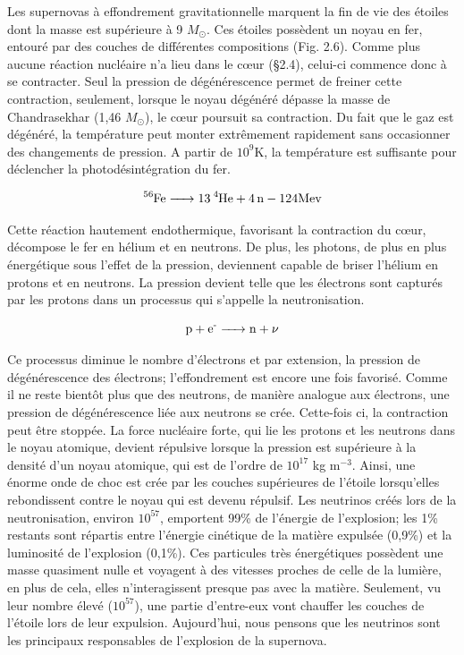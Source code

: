 Les supernovas à effondrement gravitationnelle marquent la fin de vie des étoiles dont la masse est supérieure à 9 $M_\odot$. Ces étoiles possèdent un noyau en fer, entouré par des couches de différentes compositions (Fig. 2.6). Comme plus aucune réaction nucléaire n'a lieu dans le cœur (§2.4), celui-ci commence donc à se contracter. Seul la pression de dégénérescence permet de freiner cette contraction, seulement, lorsque le noyau dégénéré dépasse la masse de Chandrasekhar (1,46 $M_\odot$), le cœur poursuit sa contraction. Du fait que le gaz est dégénéré, la température peut monter extrêmement rapidement sans occasionner des changements de pression. A partir de $10^{9}$K, la température est suffisante pour déclencher la photodésintégration du fer.\bigskip  %

\begin{equation} \ce{\ce{^{56}Fe} -> \ce{13\ce{^{4}He}} + \ce{4n} - {124Mev}}\end{equation}\bigskip

Cette réaction hautement endothermique, favorisant la contraction du cœur, décompose le fer en hélium et en neutrons. De plus, les photons, de plus en plus énergétique sous l'effet de la pression, deviennent capable de briser l'hélium en protons et en neutrons. La pression devient telle que les électrons sont capturés par les protons dans un processus qui s'appelle la neutronisation.\bigskip

\begin{equation} \ce{p + e{^-} -> n + $\nu$}\end{equation}\bigskip

Ce processus diminue le nombre d'électrons et par extension, la pression de dégénérescence des électrons; l'effondrement est encore une fois favorisé. Comme il ne reste bientôt plus que des neutrons, de manière analogue aux électrons, une pression de dégénérescence liée aux neutrons se crée. Cette-fois ci, la contraction  peut être stoppée. La force nucléaire forte, qui lie les protons et les neutrons dans le noyau atomique, devient répulsive lorsque la pression est supérieure à la densité d'un noyau atomique, qui est de l'ordre de $10^{17}$ kg  m$^{-3}$. Ainsi, une énorme onde de choc est crée par les couches supérieures de l'étoile lorsqu'elles rebondissent contre le noyau qui est devenu répulsif.
Les neutrinos créés lors de la neutronisation, environ $10^{57}$, emportent 99\% de l'énergie de l'explosion; les 1\% restants sont répartis entre l'énergie cinétique de la matière expulsée (0,9\%) et la luminosité de l'explosion (0,1\%). Ces particules très énergétiques possèdent une masse quasiment nulle et voyagent à des vitesses proches de celle de la lumière, en plus de cela, elles n'interagissent presque pas avec la matière. Seulement, vu leur nombre élevé ($10^{57}$), une partie d'entre-eux vont chauffer les couches de l'étoile lors de leur expulsion. Aujourd'hui, nous pensons que les neutrinos sont les principaux responsables de l'explosion de la supernova.\smallskip

